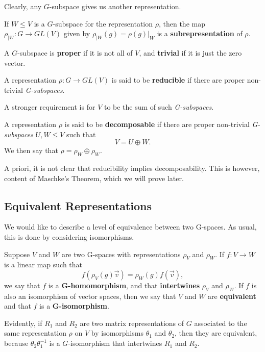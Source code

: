 \documentclass[a4paper]{article}
\begin{document}
Clearly, any $G$-subspace gives us another representation.

\begin{defi}
    If $W \leq V$ is a $G$-subspace for the representation $\rho$, then the map $\rho_{|W}: G \to GL(V)$ given by $\rho_{|W}(g) = \rho(g)|_{W}$ is a \textbf{subrepresentation} of $\rho$.
\end{defi}

A $G$-subspace is \textbf{proper} if it is not all of $V$, and \textbf{trivial} if it is just the zero vector.

\begin{defi}[Reducible]
    A representation $\rho: G \to GL(V)$ is said to be \textbf{reducible} if there are proper non-trivial \textit{G-subspaces}.
\end{defi}

A stronger requirement is for $V$ to be the sum of such \textit{G-subspaces}.

\begin{defi}[Decomposable]
    A representation $\rho$ is said to be \textbf{decomposable} if there are proper non-trivial \textit{G-subspaces} $U,W \leq V$ such that $$V = U \oplus W.$$ We then say that $\rho = \rho_W \oplus \rho_W$.
\end{defi}

A priori, it is not clear that reducibility implies decomposability. This is however, content of Maschke's Theorem, which we will prove later.

\subsection{Equivalent Representations}
We would like to describe a level of equivalence between two G-spaces. As usual, this is done by considering isomorphisms.

\begin{defi}[G-homomorphism]
    Suppose $V$ and $W$ are two G-spaces with representations $\rho_V$ and $\rho_W$. If $f: V \to W$ is a linear map such that $$f(\rho_V(g)\vec{v}) = \rho_W(g)f(\vec{v}),$$ we say that $f$ is a \textbf{G-homomorphism}, and that \textbf{intertwines} $\rho_V$ and $\rho_W$. If $f$ is also an isomorphism of vector spaces, then we say that $V$ and $W$ are \textbf{equivalent} and that $f$ is a \textbf{G-isomorphism}.
\end{defi}

Evidently, if $R_1$ and $R_2$ are two matrix representations of $G$ associated to the same representation $\rho$ on $V$ by isomorphisms $\theta_1$ and $\theta_2$, then they are equivalent, because $\theta_2 \theta_1^{-1}$ is a $G$-isomorphism that intertwines $R_1$ and $R_2$. 
\end{document}
